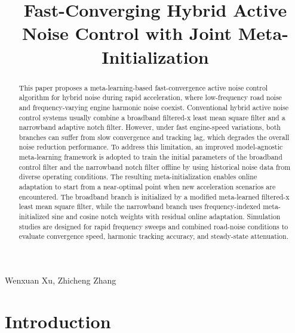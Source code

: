 \documentclass{internoise2026}
\begin{document}
\title{Fast-Converging Hybrid Active Noise Control with Joint Meta-Initialization}

\maketitle

\begin{flushleft}
  Wenxuan Xu,\markcorrespondingpresenting{}
  Zhicheng Zhang


\end{flushleft}

\smallskip
\begin{abstract}
This paper proposes a meta-learning-based fast-convergence active noise control algorithm for hybrid noise during rapid acceleration, where low-frequency road noise and frequency-varying engine harmonic noise coexist. Conventional hybrid active noise control systems usually combine a broadband filtered-x least mean square filter and a narrowband adaptive notch filter. However, under fast engine-speed variations, both branches can suffer from slow convergence and tracking lag, which degrades the overall noise reduction performance. To address this limitation, an improved model-agnostic meta-learning framework is adopted to train the initial parameters of the broadband control filter and the narrowband notch filter offline by using historical noise data from diverse operating conditions. The resulting meta-initialization enables online adaptation to start from a near-optimal point when new acceleration scenarios are encountered. The broadband branch is initialized by a modified meta-learned filtered-x least mean square filter, while the narrowband branch uses frequency-indexed meta-initialized sine and cosine notch weights with residual online adaptation. Simulation studies are designed for rapid frequency sweeps and combined road-noise conditions to evaluate convergence speed, harmonic tracking accuracy, and steady-state attenuation.
\end{abstract}

\section{Introduction}
\end{document}
